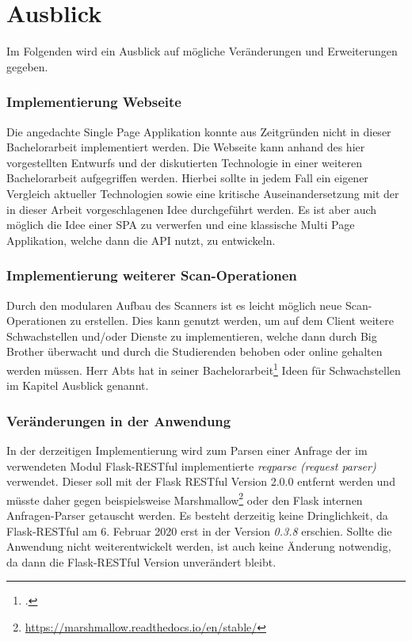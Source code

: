 \section{Ausblick}
\label{sec:Ausblick}
Im Folgenden wird ein Ausblick auf mögliche Veränderungen und Erweiterungen gegeben.

\subsubsection{Implementierung Webseite}
Die angedachte Single Page Applikation konnte aus Zeitgründen nicht in dieser Bachelorarbeit implementiert werden. Die Webseite kann anhand des hier vorgestellten Entwurfs und der diskutierten Technologie in einer weiteren Bachelorarbeit aufgegriffen werden. Hierbei sollte in jedem Fall ein eigener Vergleich aktueller Technologien sowie eine kritische Auseinandersetzung mit der in dieser Arbeit vorgeschlagenen Idee durchgeführt werden. Es ist aber auch möglich die Idee einer SPA zu verwerfen und eine klassische Multi Page Applikation, welche dann die API nutzt, zu entwickeln.

\subsubsection{Implementierung weiterer Scan-Operationen}
Durch den modularen Aufbau des Scanners ist es leicht möglich neue Scan-Operationen zu erstellen. Dies kann genutzt werden, um auf dem Client weitere Schwachstellen und/oder Dienste zu implementieren, welche dann durch Big Brother überwacht und durch die Studierenden behoben oder online gehalten werden müssen. Herr Abts hat in seiner Bachelorarbeit\footcite{abtsUeberarbeitungUndErweiterung2016} Ideen für Schwachstellen im Kapitel Ausblick genannt. 

\subsubsection{Veränderungen in der Anwendung}
In der derzeitigen Implementierung wird zum Parsen einer Anfrage der im verwendeten Modul Flask-RESTful implementierte \textit{reqparse (request parser)} verwendet. Dieser soll mit der Flask RESTful Version 2.0.0 entfernt werden und müsste daher gegen beispielsweise Marshmallow\footnote{\url{https://marshmallow.readthedocs.io/en/stable/}} oder den Flask internen Anfragen-Parser getauscht werden. Es besteht derzeitig keine Dringlichkeit, da Flask-RESTful am 6. Februar 2020 erst in der Version \textit{0.3.8} erschien. Sollte die Anwendung nicht weiterentwickelt werden, ist auch keine Änderung notwendig, da dann die Flask-RESTful Version unverändert bleibt.

